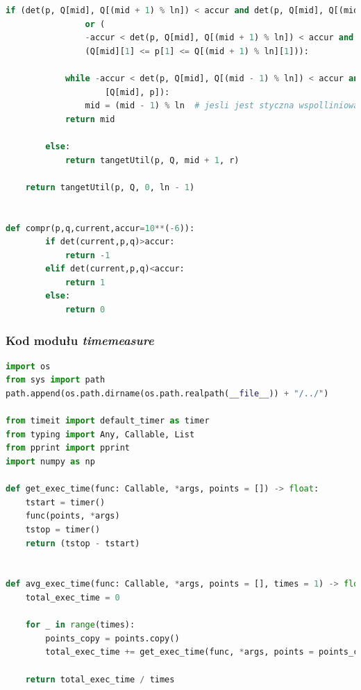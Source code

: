 \documentclass[11pt]{article}
\theoremstyle{remark} \newtheorem{definition}{def.}
\theoremstyle{definition} \newtheorem{twierdzenie}{tw.}
\begin{document}
\begin{lstlisting}[language=Python]
        if (det(p, Q[mid], Q[(mid + 1) % ln]) < accur and det(p, Q[mid], Q[(mid - 1) % ln]) < accur) \
                or (
                -accur < det(p, Q[mid], Q[(mid + 1) % ln]) < accur and (Q[mid][0] <= p[0] <= Q[(mid + 1) % ln][0]) and \
                (Q[mid][1] <= p[1] <= Q[(mid + 1) % ln][1])):

            while -accur < det(p, Q[mid], Q[(mid - 1) % ln]) < accur and length([Q[(mid - 1) % ln], p]) > length(
                    [Q[mid], p]):
                mid = (mid - 1) % ln  # jesli jest styczna wspolliniowa, to bierzmy pod uwage punkt blizszy
            return mid

        else:
            return tangetUtil(p, Q, mid + 1, r)

    return tangetUtil(p, Q, 0, ln - 1)


def compr(p,q,current,accur=10**(-6)):
        if det(current,p,q)>accur:
            return -1
        elif det(current,p,q)<accur:
            return 1
        else:
            return 0
\end{lstlisting}

\subsubsection*{Kod modułu \emph{timemeasure}}
\begin{lstlisting}[language=Python]
import os
from sys import path
path.append(os.path.dirname(os.path.realpath(__file__)) + "/../")

from timeit import default_timer as timer
from typing import Any, Callable, List
from pprint import pprint
import numpy as np

def get_exec_time(func: Callable, *args, points = []) -> float:
    tstart = timer()
    func(points, *args)
    tstop = timer()
    return (tstop - tstart)

    
def avg_exec_time(func: Callable, *args, points = [], times = 1) -> float:
    total_exec_time = 0
    
    for _ in range(times):
        points_copy = points.copy()
        total_exec_time += get_exec_time(func, *args, points = points_copy)
        
    return total_exec_time / times
\end{lstlisting}
\end{document}
